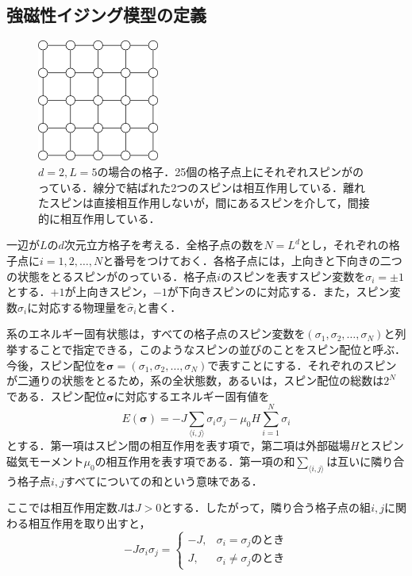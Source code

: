 \documentclass[a4paper,11pt]{jsreport}
\begin{document}
\subsection{強磁性イジング模型の定義}
\begin{figure}[H]
  \begin{center}
      \includegraphics[height=4cm]{image/2次元格子.png}
      \caption{$d=2, L=5$の場合の格子．25個の格子点上にそれぞれスピンがのっている．線分で結ばれた2つのスピンは相互作用している．離れたスピンは直接相互作用しないが，間にあるスピンを介して，間接的に相互作用している．}
  \end{center}
\end{figure}
一辺が$L$の$d$次元立方格子を考える．全格子点の数を$N=L^d$とし，それぞれの格子点に$i=1,2,\dots ,N$と番号をつけておく．各格子点には，上向きと下向きの二つの状態をとるスピンがのっている．格子点$i$のスピンを表すスピン変数を$\sigma_i = \pm{1}$とする．$+1$が上向きスピン，$-1$が下向きスピンのに対応する．また，スピン変数$\sigma_i$に対応する物理量を$\hat{\sigma}_i$と書く．\par
系のエネルギー固有状態は，すべての格子点のスピン変数を$(\sigma_1, \sigma_2, \dots, \sigma_N)$と列挙することで指定できる，このようなスピンの並びのことをスピン配位と呼ぶ．今後，スピン配位を$\bm{\sigma}=(\sigma_1, \sigma_2, \dots, \sigma_N)$で表すことにする．それぞれのスピンが二通りの状態をとるため，系の全状態数，あるいは，スピン配位の総数は$2^N$である．スピン配位$\bm{\sigma}$に対応するエネルギー固有値を
\begin{equation}
  E(\bm{\sigma}) = -J \sum_{\langle i, j \rangle} \sigma_i \sigma_j
  - \mu_0 H \sum_{i=1}^{N} \sigma_i \label{イジングエネルギー}
\end{equation}
とする．第一項はスピン間の相互作用を表す項で，第二項は外部磁場$H$とスピン磁気モーメント$\mu_0$の相互作用を表す項である．第一項の和$\sum_{\langle i, j \rangle}$は互いに隣り合う格子点$i,j$すべてについての和という意味である．\par
ここでは相互作用定数$J$は$J>0$とする．したがって，隣り合う格子点の組$i,j$に関わる相互作用を取り出すと，
\begin{equation}
  -J \sigma_i \sigma_j =
  \begin{cases}
    -J, & \sigma_i = \sigma_j \text{のとき}    \\
    J,  & \sigma_i \neq \sigma_j \text{のとき}
  \end{cases} \label{相互作用項場合分け}
\end{equation}
\end{document}
